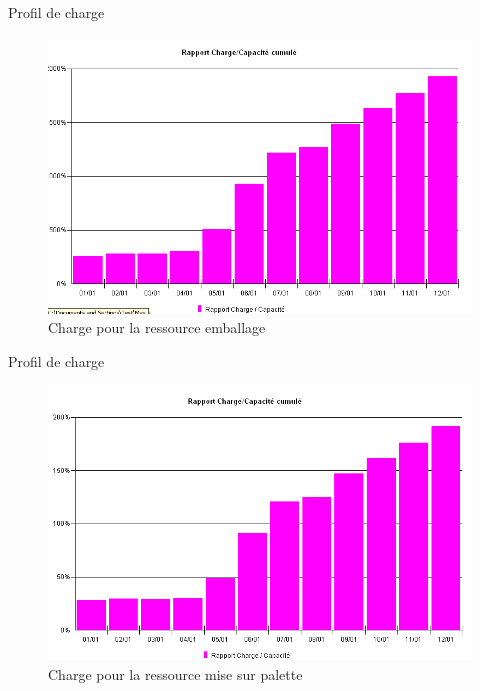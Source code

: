 \begin{frame}{Profil de charge}
\begin{figure}[H]
\centering
\includegraphics[scale=0.4]{../Organisationnelle/captures/charge_emb.PNG}
\caption{Charge pour la ressource emballage}
\end{figure}
\end{frame}

\begin{frame}{Profil de charge}
\begin{figure}[H]
\centering
\includegraphics[scale=0.4]{../Organisationnelle/captures/charge_pal.png}
\caption{Charge pour la ressource mise sur palette}
\end{figure}
\end{frame}